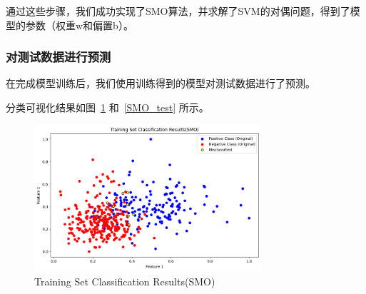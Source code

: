 \documentclass[12pt]{article}
\begin{document}
通过这些步骤，我们成功实现了SMO算法，并求解了SVM的对偶问题，得到了模型的参数（权重w和偏置b）。

\subsubsection{对测试数据进行预测}

在完成模型训练后，我们使用训练得到的模型对测试数据进行了预测。




分类可视化结果如图~\ref{SMO_train} 和~\ref{SMO_test} 所示。

\begin{figure}[htbp]
  \centering
  \includegraphics[width=0.75\textwidth]{figures/SMO_train.png}
  \caption{Training Set Classification Results(SMO)}
  \label{SMO_train}
\end{figure}
\end{document}
